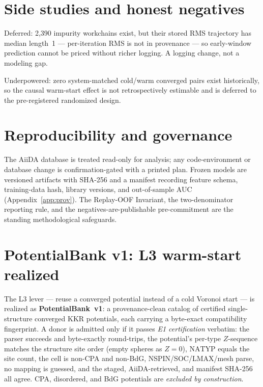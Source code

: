 \documentclass[11pt]{article}
\begin{document}
\section{Side studies and honest negatives}
\label{sec:negatives}
\begin{description}[leftmargin=1.6em,itemsep=1pt]
  \item[Impurity (KKRimp) feasibility.] Deferred: 2{,}390 impurity workchains exist, but their stored RMS
  trajectory has median length~1 --- per-iteration RMS is not in provenance --- so early-window prediction
  cannot be priced without richer logging. A logging change, not a modeling gap.
  \item[Warm-start (L3) matched pairs.] Underpowered: zero system-matched cold/warm converged pairs exist
  historically, so the causal warm-start effect is not retrospectively estimable and is deferred to the
  pre-registered randomized design.
\end{description}

\section{Reproducibility and governance}
\label{sec:governance}
The AiiDA database is treated read-only for analysis; any code-environment or database change is
confirmation-gated with a printed plan. Frozen models are versioned artifacts with SHA-256 and a manifest
recording feature schema, training-data hash, library versions, and out-of-sample AUC
(Appendix~\ref{app:prov}). The Replay-OOF Invariant, the two-denominator reporting rule, and the
negatives-are-publishable pre-commitment are the standing methodological safeguards.

\section{PotentialBank v1: L3 warm-start realized}
\label{sec:potbank}
The L3 lever --- reuse a converged potential instead of a cold Voronoi start --- is realized as
\textbf{PotentialBank~v1}: a provenance-clean catalog of certified single-structure converged KKR potentials,
each carrying a byte-exact compatibility fingerprint. A donor is admitted only if it passes \emph{E1
certification} verbatim: the parser succeeds and byte-exactly round-trips, the potential's per-type
$Z$-sequence matches the structure site order (empty spheres as $Z{=}0$), $\mathrm{NATYP}$ equals the site
count, the cell is non-CPA and non-BdG, NSPIN/SOC/LMAX/mesh parse, no mapping is guessed, and the staged,
AiiDA-retrieved, and manifest SHA-256 all agree. CPA, disordered, and BdG potentials are \emph{excluded by
construction}.
\end{document}
